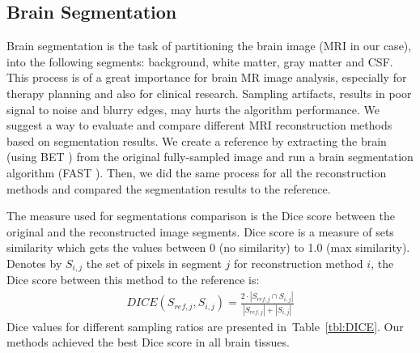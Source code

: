 \documentclass[review]{elsarticle}
\begin{document}
\subsection{Brain Segmentation}
Brain segmentation is the task of partitioning the brain image (MRI in our case), into the following segments: background, white matter, gray matter and CSF. This process is of a great importance for brain MR image analysis, especially for therapy planning and also for clinical research. Sampling artifacts, results in poor signal to noise and blurry edges, may hurts the algorithm performance.
We suggest a way to evaluate and compare different MRI reconstruction methods based on segmentation results. We create a reference by extracting the brain (using BET \cite{smith2002fast}) from the original fully-sampled image and run a brain segmentation algorithm (FAST \cite{zhang2001segmentation}). Then, we did the same process for all the reconstruction methods and compared the segmentation results to the reference.

The measure used for segmentations comparison is the Dice score \cite{dice1945measures} between the original and the reconstructed image segments. Dice score is a measure of sets similarity which gets the values between 0 (no similarity) to 1.0 (max similarity). Denotes by $S_{i,j}$ the set of pixels in segment $j$ for reconstruction method $i$, the Dice score between this method to the reference is:
\begin{equation}
\begin{array}{c}
DICE(S_{ref,j},S_{i,j}) = \frac{2\cdot|S_{ref,j} \cap S_{i,j}|} {|S_{ref,j}| + |S_{i,j}|}
\end{array}
\end{equation}
Dice values for different sampling ratios are presented in~Table~\ref{tbl:DICE}. Our methods achieved the best Dice score in all brain tissues.
\end{document}
